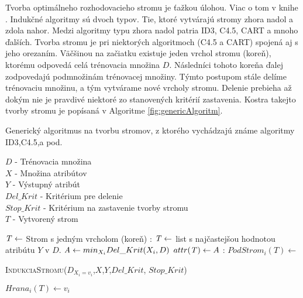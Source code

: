 Tvorba optimálneho rozhodovacieho stromu je ťažkou úlohou. Viac o tom v knihe \cite[s.51]{kap1-DataMiningForTrees}. Indukčné algoritmy sú dvoch typov. Tie, ktoré vytvárajú stromy zhora nadol a zdola nahor. Medzi algoritmy typu zhora nadol patria ID3, C4.5, CART a mnoho ďalších. Tvorba stromu je pri niektorých algoritmoch (C4.5 a CART) spojená aj s jeho orezaním. Väčšinou na začiatku existuje jeden vrchol stromu (koreň), ktorému odpovedá celá trénovacia množina $D$. Následníci tohoto koreňa ďalej zodpovedajú podmnožinám trénovacej množiny. Týmto postupom stále delíme trénovaciu množinu, a tým vytvárame nové vrcholy stromu. Delenie prebieha až dokým nie je pravdivé niektoré zo stanovených kritérií zastavenia. Kostra takejto tvorby stromu je popísaná v Algoritme  \ref{fig:genericAlgoritm}.

\begin{algorithm} 
\caption{Generický algoritmus na tvorbu stromov, z ktorého vychádzajú známe algoritmy ID3,C4.5,a pod.}\label{fig:genericAlgoritm}
$D$ - Trénovacia množina \\
$X$ - Množina atribútov \\
$Y$ - Výstupný atribút \\
$Del\_Krit$ - Kritérium pre delenie \\
$Stop\_Krit$ - Kritérium na zastavenie tvorby stromu \\
$T$ - Vytvorený strom 
\begin{algorithmic}
\State $\mathit{T} \gets $ Strom s jedným vrcholom (koreň)
:	  
\State $\mathit{T} \gets $ list s najčastejšou hodnotou atribútu $Y$ v $D$.
\Else
\State $\mathit{A} \gets min_{X_{i}}Del\_Krit(X_{i},D)$
\State $attr(\mathit{T}) \gets A$
\EndIf
{}:
\State $PodStrom_{i}(T) \gets $ \parbox[t]{280pt}{\textsc{IndukciaStromu}($D_{X_{i} = v_{i}}$,$X$,$Y$,$Del\_Krit$, $Stop\_Krit$)} 
\State $Hrana_{i}(T) \gets v_{i}$  
\EndFor \\
\EndFunction
\end{algorithmic}
\end{algorithm}

